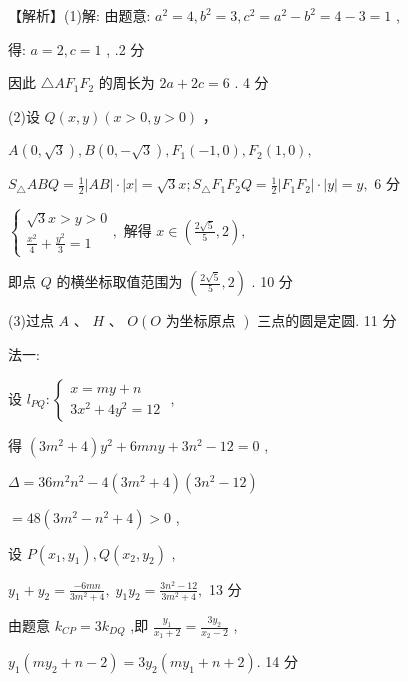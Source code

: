 \documentclass[10pt]{article}
\begin{document}
【解析】(1)解: 由题意: \({a}^{2} = 4,{b}^{2} = 3,{c}^{2} = {a}^{2} - {b}^{2} = 4 - 3 = 1\) ,

得: \(a = 2,c = 1\) , .2 分

因此 \(\bigtriangleup A{F}_{1}{F}_{2}\) 的周长为 \({2a} + {2c} = 6\) . 4 分

(2)设 \(Q\left( {x,y}\right) \left( {x > 0,y > 0}\right)\) ，

\(A\left( {0,\sqrt{3}}\right) ,B\left( {0, - \sqrt{3}}\right) ,{F}_{1}\left( {-1,0}\right) ,{F}_{2}\left( {1,0}\right) ,\)

\({S}_{\bigtriangleup }{ABQ} = \frac{1}{2}\left| {AB}\right|  \cdot  \left| x\right|  = \sqrt{3}x;{S}_{\bigtriangleup }{F}_{1}{F}_{2}Q = \frac{1}{2}\left| {{F}_{1}{F}_{2}}\right|  \cdot  \left| y\right|  = y,\) 6 分

\(\left\{  {\begin{array}{l} \sqrt{3}x > y > 0 \\  \frac{{x}^{2}}{4} + \frac{{y}^{2}}{3} = 1 \end{array},\text{ 解得 }x \in  \left( {\frac{2\sqrt{5}}{5},2}\right) ,}\right.\)

即点 \(Q\) 的横坐标取值范围为 \(\left( {\frac{2\sqrt{5}}{5},2}\right)\) . 10 分

(3)过点 \(A\) 、 \(H\) 、 \(O\left( {O\text{ 为坐标原点 }}\right)\) 三点的圆是定圆. 11 分

法一:

设 \({l}_{PQ} : \left\{  \begin{array}{l} x = {my} + n \\  3{x}^{2} + 4{y}^{2} = {12} \end{array}\right.\) ,

得 \(\left( {3{m}^{2} + 4}\right) {y}^{2} + {6mny} + 3{n}^{2} - {12} = 0\) ,

\(\Delta  = {36}{m}^{2}{n}^{2} - 4\left( {3{m}^{2} + 4}\right) \left( {3{n}^{2} - {12}}\right)\)

\(= {48}\left( {3{m}^{2} - {n}^{2} + 4}\right)  > 0\) ,

设 \(P\left( {{x}_{1},{y}_{1}}\right) ,Q\left( {{x}_{2},{y}_{2}}\right)\) ,

\({y}_{1} + {y}_{2} = \frac{-{6mn}}{3{m}^{2} + 4},\;{y}_{1}{y}_{2} = \frac{3{n}^{2} - {12}}{3{m}^{2} + 4},\) 13 分

由题意 \({k}_{CP} = 3{k}_{DQ}\) ,即 \(\frac{{y}_{1}}{{x}_{1} + 2} = \frac{3{y}_{2}}{{x}_{2} - 2}\) ,

\({y}_{1}\left( {m{y}_{2} + n - 2}\right)  = 3{y}_{2}\left( {m{y}_{1} + n + 2}\right) .\) 14 分
\end{document}
